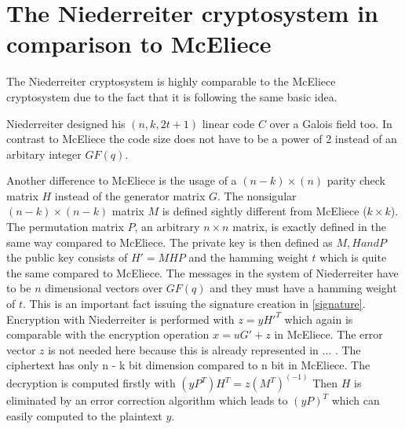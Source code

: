 
\section{The Niederreiter cryptosystem in comparison to McEliece}
\label{niederreither}
The Niederreiter cryptosystem is highly comparable to the McEliece cryptosystem due to the fact that it is following the same basic idea. 

Niederreiter designed his $(n, k, 2t + 1)$ linear code $C$ over a Galois field too. In contrast to McEliece the code size does not have to be a power of 2 instead of an arbitary integer $GF(q)$. 

Another difference to McEliece is the usage of a $(n - k) \times (n)$ parity check matrix $H$ instead of  the generator matrix $G$. %
The nonsigular $(n - k) \times (n - k)$ matrix $M$ is defined sightly different from McEliece ($k \times k$).%
The permutation matrix $P$, an arbitrary $n \times n$ matrix, is exactly defined in the same way compared to McEliece.
The private key is then defined as $M, H and P$ the public key consists of $H' = MHP$ and the hamming weight $t$ which is quite the same compared to McEliece.
The messages in the system of Niederreiter have to be $n$ dimensional vectors over $GF(q)$ and they must have a hamming weight of $t$. This is an important fact issuing the signature creation in \autoref{signature}.
Encryption with Niederreiter is performed with $z = yH'^T$ which again is comparable with the encryption operation $x = uG' + z$ in McEliece. The error vector $z$ is not needed here because this is already represented in ... . The ciphertext has only n - k bit dimension compared to n bit in McEliece. 
The decryption is computed firstly with $(yP^T)H^T = z(M^T)^(-1)$ Then $H$ is eliminated by an error correction algorithm which leads to $(yP)^T$ which can easily computed to the plaintext $y$. \cite{sendrier2011niederreiter}\cite{li1994equivalence}\cite{niederreiter1986knapsack}









